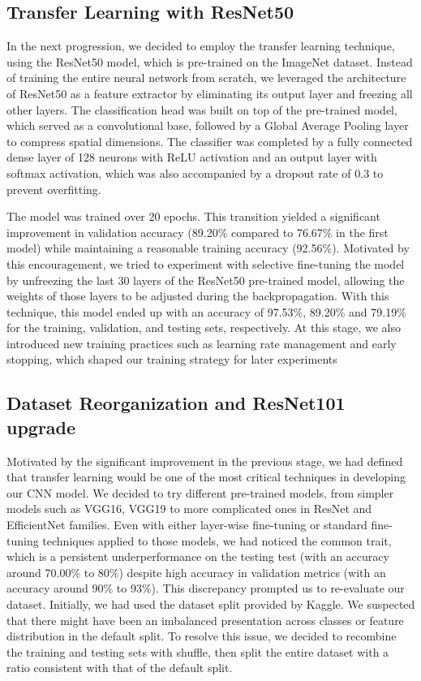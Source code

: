 \documentclass[conference]{IEEEtran}
\begin{document}
\subsection{\large Transfer Learning with ResNet50}
In the next progression, we decided to employ the transfer learning technique, using the ResNet50 model,
which is pre-trained on the ImageNet dataset. Instead of training the entire neural network from scratch, 
we leveraged the architecture of ResNet50 as a feature extractor by eliminating its output layer and freezing all other layers. 
The classification head was built on top of the pre-trained model, which served as a convolutional base, followed by a Global Average Pooling layer to compress spatial dimensions. 
The classifier was completed by a fully connected dense layer of 128 neurons with ReLU activation and an output layer with softmax activation, which was also accompanied by a dropout rate of 0.3 to prevent overfitting. \

The model was trained over 20 epochs. This transition yielded a significant improvement in validation accuracy (89.20\% compared to 76.67\% in the first model) 
while maintaining a reasonable training accuracy (92.56\%). Motivated by this encouragement, we tried to experiment with selective fine-tuning the model by unfreezing the last 30 layers of the ResNet50 pre-trained model, 
allowing the weights of those layers to be adjusted during the backpropagation. With this technique, this model ended up with an accuracy of 97.53\%, 89.20\% and 79.19\% for the training, validation, and testing sets, respectively. At this stage, we also introduced new training practices such as learning rate management and early stopping, which shaped our training strategy for later experiments

\subsection{\large Dataset Reorganization and ResNet101 upgrade}
Motivated by the significant improvement in the previous stage, we had defined that transfer learning would be one of the most critical techniques in developing our CNN model. We decided to try different pre-trained models, 
from simpler models such as VGG16, VGG19 to more complicated ones in ResNet and EfficientNet families. 
Even with either layer-wise fine-tuning or standard fine-tuning techniques applied to those models, 
we had noticed the common trait, which is a persistent underperformance on the testing test (with an accuracy around 70.00\% to 80\%) 
despite high accuracy in validation metrics (with an accuracy around 90\% to 93\%). This discrepancy prompted us to re-evaluate our dataset. 
Initially, we had used the dataset split provided by Kaggle. We suspected that there might have been an imbalanced presentation across classes or feature distribution in the default split. 
To resolve this issue, we decided to recombine the training and testing sets with shuffle, then split the entire dataset with a ratio consistent with that of the default split. \ 
\end{document}

